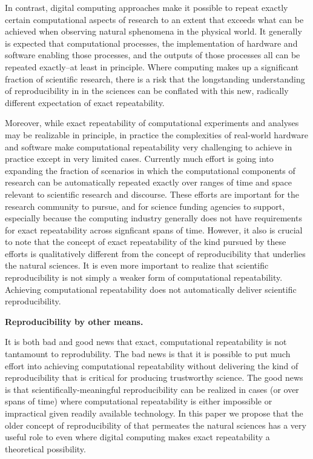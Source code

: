 In contrast, digital computing approaches make it possible to repeat exactly certain computational aspects of research
	to an extent that exceeds what can be achieved when observing natural sphenomena in the physical world.  
It generally is expected that computational processes, the implementation of hardware and software 
	enabling those processes, and the outputs of those processes all can be repeated exactly--at least in principle.
Where computing makes up a significant fraction of scientific research, there is a risk that the longstanding
	understanding of reproducibility in in the sciences can be conflated with this new, radically different 
	expectation of exact repeatability. 

Moreover, while exact repeatability of computational experiments and analyses may be realizable in principle, 
	in practice the complexities of real-world hardware and software make computational repeatability 
	very challenging to achieve in practice except in very limited cases.
Currently much effort is going into expanding the fraction of scenarios in which the computational
	components of research can be automatically repeated exactly over ranges of time and space relevant to scientific 
	research and discourse.
These efforts are important for the research community to pursue, and for science funding
	agencies to support, especially because the computing industry generally does not have 
	requirements for exact repeatability across signficant spans of time.
However, it also is crucial to note that the concept of exact repeatability of the kind pursued by these efforts is 
	qualitatively different from the concept of reproducibility that underlies the natural sciences.
It is even more important to realize that scientific reproducibility is not simply a weaker form of computational
	repeatability.  
Achieving computational repeatability does not automatically deliver scientific reproducibility.


\textbf{Reproducibility by other means.}

It is both bad and good news that exact, computational repeatability is not tantamount to reprodubility.
The bad news is that it is possible to put much effort into achieving computational repeatability without delivering
	the kind of reproducibility that is critical for producing trustworthy science.
The good news is that scientifically-meaningful reproducibility can be realized in cases (or over spans of time)
	where computational repeatability is either impossible or impractical given readily available technology.
In this paper we propose that the older concept of reproducibility of that permeates the natural sciences has a very
	useful role to even where digital computing makes exact repeatability a theoretical possibility.

